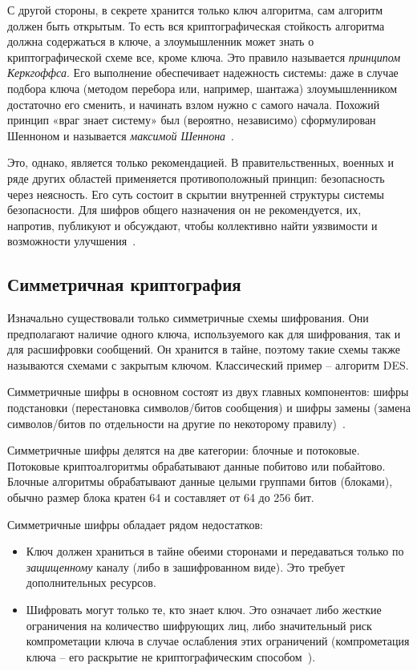 С другой стороны, в секрете хранится только ключ алгоритма, сам алгоритм должен быть открытым. То есть вся криптографическая стойкость алгоритма должна содержаться в ключе, а злоумышленник может знать о криптографической схеме все, кроме ключа. Это правило называется \textit{принципом Керкгоффса}. Его выполнение обеспечивает надежность системы: даже в случае подбора ключа (методом перебора или, например, шантажа) злоумышленником достаточно его сменить, и начинать взлом нужно с самого начала. Похожий принцип «враг знает систему» был (вероятно, независимо) сформулирован Шенноном и называется \textit{максимой Шеннона}~\cite{src13}.

Это, однако, является только рекомендацией. В правительственных, военных и ряде других областей применяется противоположный принцип: безопасность через неясность. Его суть состоит в скрытии внутренней структуры системы безопасности. Для шифров общего назначения он не рекомендуется, их, напротив, публикуют и обсуждают, чтобы коллективно найти уязвимости и возможности улучшения~\cite{src14}.

\subsection{Симметричная криптография} %

Изначально существовали только симметричные схемы шифрования. Они предполагают наличие одного ключа, используемого как для шифрования, так и для расшифровки сообщений. Он хранится в тайне, поэтому такие схемы также называются схемами с закрытым ключом. Классический пример – алгоритм DES.

Симметричные шифры в основном состоят из двух главных компонентов: шифры подстановки (перестановка символов/битов сообщения) и шифры замены (замена символов/битов по отдельности на другие по некоторому правилу)~\cite{src8}. 

Симметричные шифры делятся на две категории: блочные и потоковые. Потоковые криптоалгоритмы обрабатывают данные побитово или побайтово. Блочные алгоритмы обрабатывают данные целыми группами битов (блоками), обычно размер блока кратен 64 и составляет от 64 до 256 бит.

Симметричные шифры обладает рядом недостатков:
\begin{itemize}
	\item Ключ должен храниться в тайне обеими сторонами и передаваться только по \textit{защищенному} каналу (либо в зашифрованном виде). Это требует дополнительных ресурсов.
	\item Шифровать могут только те, кто знает ключ. Это означает либо жесткие ограничения на количество шифрующих лиц, либо значительный риск компрометации ключа в случае ослабления этих ограничений (компрометация ключа – его раскрытие не криптографическим способом~\cite{src15}).
\end{itemize}

